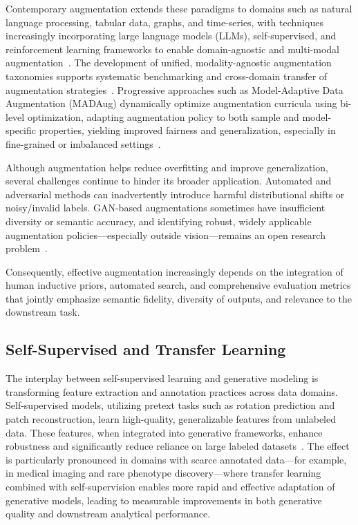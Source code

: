 \documentclass[sigconf]{acmart}
\begin{document}
Contemporary augmentation extends these paradigms to domains such as natural language processing, tabular data, graphs, and time-series, with techniques increasingly incorporating large language models (LLMs), self-supervised, and reinforcement learning frameworks to enable domain-agnostic and multi-modal augmentation~\cite{ref1,ref2,ref3,ref5,ref6,ref10,ref12,ref13,ref14,ref15,ref16,ref18,ref21,ref22,ref23,ref24,ref25,ref26,ref29,ref30,ref32,ref60,ref62,ref64,ref65,ref70,ref83}. The development of unified, modality-agnostic augmentation taxonomies supports systematic benchmarking and cross-domain transfer of augmentation strategies~\cite{ref60,ref62,ref64}. Progressive approaches such as Model-Adaptive Data Augmentation (MADAug) dynamically optimize augmentation curricula using bi-level optimization, adapting augmentation policy to both sample and model-specific properties, yielding improved fairness and generalization, especially in fine-grained or imbalanced settings~\cite{ref66}.

Although augmentation helps reduce overfitting and improve generalization, several challenges continue to hinder its broader application. Automated and adversarial methods can inadvertently introduce harmful distributional shifts or noisy/invalid labels. GAN-based augmentations sometimes have insufficient diversity or semantic accuracy, and identifying robust, widely applicable augmentation policies—especially outside vision—remains an open research problem~\cite{ref62,ref66,ref85}. 

Consequently, effective augmentation increasingly depends on the integration of human inductive priors, automated search, and comprehensive evaluation metrics that jointly emphasize semantic fidelity, diversity of outputs, and relevance to the downstream task.

\subsection{Self-Supervised and Transfer Learning}

The interplay between self-supervised learning and generative modeling is transforming feature extraction and annotation practices across data domains. Self-supervised models, utilizing pretext tasks such as rotation prediction and patch reconstruction, learn high-quality, generalizable features from unlabeled data. These features, when integrated into generative frameworks, enhance robustness and significantly reduce reliance on large labeled datasets~\cite{ref79}. The effect is particularly pronounced in domains with scarce annotated data—for example, in medical imaging and rare phenotype discovery—where transfer learning combined with self-supervision enables more rapid and effective adaptation of generative models, leading to measurable improvements in both generative quality and downstream analytical performance.
\end{document}
